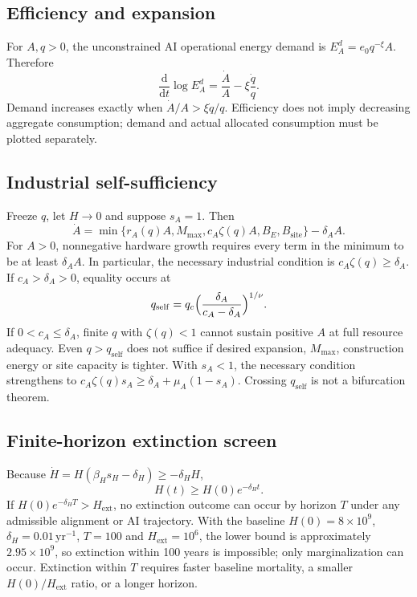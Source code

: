 \documentclass[11pt]{article}
\newcommand{\dd}{\mathrm{d}}
\begin{document}
\subsection{Efficiency and expansion}
For $A,q>0$, the unconstrained AI operational energy demand is $E_A^d=e_0q^{-\xi}A$. Therefore
\begin{equation}
\frac{\dd}{\dd t}\log E_A^d=\frac{\dot A}{A}-\xi\frac{\dot q}{q}.
\label{eq:efficiency}
\end{equation}
Demand increases exactly when $\dot A/A>\xi\dot q/q$. Efficiency does not imply decreasing aggregate consumption; demand and actual allocated consumption must be plotted separately.

\subsection{Industrial self-sufficiency}
Freeze $q$, let $H\to0$ and suppose $s_A=1$. Then
\begin{equation}
\dot A=\min\{r_A(q)A,M_{\max},c_A\zeta(q)A,B_E,B_{\mathrm{site}}\}-\delta_AA.
\label{eq:selfA}
\end{equation}
For $A>0$, nonnegative hardware growth requires every term in the minimum to be at least $\delta_AA$. In particular, the necessary industrial condition is $c_A\zeta(q)\ge\delta_A$. If $c_A>\delta_A>0$, equality occurs at
\begin{equation}
q_{\mathrm{self}}=q_c\Bigl(\frac{\delta_A}{c_A-\delta_A}\Bigr)^{1/\nu}.
\label{eq:qself}
\end{equation}
If $0<c_A\le\delta_A$, finite $q$ with $\zeta(q)<1$ cannot sustain positive $A$ at full resource adequacy. Even $q>q_{\mathrm{self}}$ does not suffice if desired expansion, $M_{\max}$, construction energy or site capacity is tighter. With $s_A<1$, the necessary condition strengthens to $c_A\zeta(q)s_A\ge\delta_A+\mu_A(1-s_A)$. Crossing $q_{\mathrm{self}}$ is not a bifurcation theorem.

\subsection{Finite-horizon extinction screen}
Because $\dot H=H(\beta_Hs_H-\delta_H)\ge-\delta_HH$,
\begin{equation}
H(t)\ge H(0)e^{-\delta_Ht}.
\label{eq:Hbound}
\end{equation}
If $H(0)e^{-\delta_HT}>H_{\mathrm{ext}}$, no extinction outcome can occur by horizon $T$ under any admissible alignment or AI trajectory. With the baseline $H(0)=8\times10^9$, $\delta_H=0.01\,\mathrm{yr}^{-1}$, $T=100$ and $H_{\mathrm{ext}}=10^6$, the lower bound is approximately $2.95\times10^9$, so extinction within 100 years is impossible; only marginalization can occur. Extinction within $T$ requires faster baseline mortality, a smaller $H(0)/H_{\mathrm{ext}}$ ratio, or a longer horizon.
\end{document}
